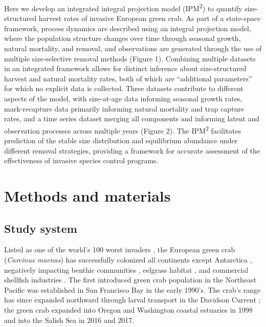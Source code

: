 \documentclass{article}
\begin{document}
Here we develop an integrated integral projection model (IPM\textsuperscript{2}) to quantify size-structured harvest rates of invasive European green crab. As part of a state-space framework, process dynamics are described using an integral projection model, where the population structure changes over time through seasonal growth, natural mortality, and removal, and observations are generated through the use of multiple size-selective removal methods (Figure 1). Combining multiple datasets in an integrated framework allows for distinct inference about size-structured harvest and natural mortality rates, both of which are “additional parameters” for which no explicit data is collected. Three datasets contribute to different aspects of the model, with size-at-age data informing seasonal growth rates, mark-recapture data primarily informing natural mortality and trap capture rates, and a time series dataset merging all components and informing latent and observation processes across multiple years (Figure 2). The IPM\textsuperscript{2} facilitates prediction of the stable size distribution and equilibrium abundance under different removal strategies, providing a framework for accurate assessment of the effectiveness of invasive species control programs.

\section{Methods and materials}

\subsection{Study system}

Listed as one of the world’s 100 worst invaders \parencite{lowe2000100}, the European green crab (\textit{Carcinus maenas}) has successfully colonized all continents except Antarctica \parencite{yamada2001global}, negatively impacting benthic communities \parencite{grosholz2005recent}, eelgrass habitat \parencite{garbary2014drastic, howard2019habitat}, and commercial shellfish industries \parencite{grosholz2011modeling}. The first introduced green crab population in the Northeast Pacific was established in San Francisco Bay in the early 1990's. The crab's range has since expanded northward through larval transport in the Davidson Current \parencite{yamada2021ocean}; the green crab expanded into Oregon and Washington coastal estuaries in 1998 and into the Salish Sea in 2016 and 2017. 
\end{document}
